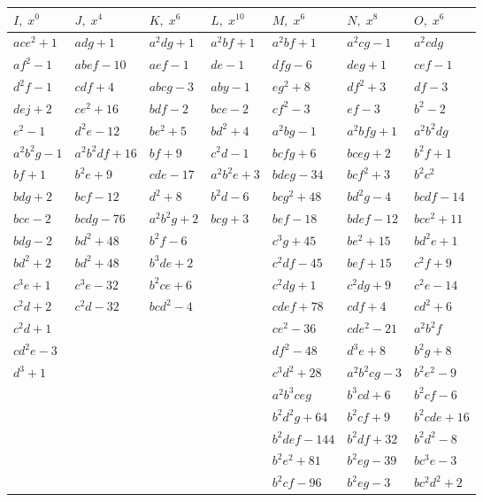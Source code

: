 \documentclass[11pt,a4paper]{article}
\begin{document}
\medskip
\begin{tabular}{|l|l|l|l|l|l|l|}
\hline
$I,\;x^{0}$ & $J,\;x^{4}$ & $K,\;x^{6}$ & $L,\;x^{10}$ & $M,\;x^{6}$ & $N,\;x^{8}$ & $O,\;x^{6}$\\
\hline
$ace^{2}+1$ & $adg+1$ & $a^{2}dg+1$ & $a^{2}bf+1$ & $a^{2}bf+1$ & $a^{2}cg-1$ & $a^{2}cdg$\\
$af^{2}-1$ & $abef-10$ & $aef-1$ & $de-1$ & $dfg-6$ & $deg+1$ & $cef-1$\\
$d^{2}f-1$ & $cdf+4$ & $abcg-3$ & $aby-1$ & $eg^{2}+8$ & $df^{2}+3$ & $df-3$\\
$dej+2$ & $ce^{2}+16$ & $bdf-2$ & $bce-2$ & $cf^{2}-3$ & $ef-3$ & $b^{2}-2$\\
$e^{2}-1$ & $d^{2}e-12$ & $be^{2}+5$ & $bd^{2}+4$ & $a^{2}bg-1$ & $a^{2}bfg+1$ & $a^{2}b^{2}dg$\\
$a^{2}b^{2}g-1$ & $a^{2}b^{2}df+16$ & $bf+9$ & $c^{2}d-1$ & $bcfg+6$ & $bceg+2$ & $b^{2}f+1$\\
$bf+1$ & $b^{2}e+9$ & $cde-17$ & $a^{2}b^{2}e+3$ & $bdeg-34$ & $bcf^{2}+3$ & $b^{2}c^{2}$\\
$bdg+2$ & $bcf-12$ & $d^{2}+8$ & $b^{2}d-6$ & $bcg^{2}+48$ & $bd^{2}g-4$ & $bcdf-14$\\
$bce-2$ & $bcdg-76$ & $a^{2}b^{2}g+2$ & $bcg+3$ & $bef-18$ & $bdef-12$ & $bce^{2}+11$\\
$bdg-2$ & $bd^{2}+48$ & $b^{2}f-6$ & & $c^{3}g+45$ & $be^{2}+15$ & $bd^{2}e+1$\\
$bd^{2}+2$ & $bd^{2}+48$ & $b^{3}de+2$ & & $c^{2}df-45$ & $bef+15$ & $c^{2}f+9$\\
$c^{3}e+1$ & $c^{3}e-32$ & $b^{2}ce+6$ & & $c^{2}dg+1$ & $c^{2}dg+9$ & $c^{2}e-14$\\
$c^{2}d+2$ & $c^{2}d-32$ & $bcd^{2}-4$ & & $cdef+78$ & $cdf+4$ & $cd^{2}+6$\\
$c^{2}d+1$ & & & & $ce^{2}-36$ & $cde^{2}-21$ & $a^{2}b^{2}f$\\
$cd^{2}e-3$ & & & & $df^{2}-48$ & $d^{3}e+8$ & $b^{2}g+8$\\
$d^{3}+1$ & & & & $c^{3}d^{2}+28$ & $a^{2}b^{2}cg-3$ & $b^{2}e^{2}-9$\\
 & & & & $a^{2}b^{3}ceg$ & $b^{3}cd+6$ & $b^{2}cf-6$\\
 & & & & $b^{2}d^{2}g+64$ & $b^{2}cf+9$ & $b^{2}cde+16$\\
 & & & & $b^{2}def-144$ & $b^{2}df+32$ & $b^{2}d^{2}-8$\\
 & & & & $b^{2}e^{2}+81$ & $b^{2}eg-39$ & $bc^{3}e-3$\\
 & & & & $b^{2}cf-96$ & $b^{2}eg-3$ & $bc^{2}d^{2}+2$\\

\end{tabular}
\end{document}
